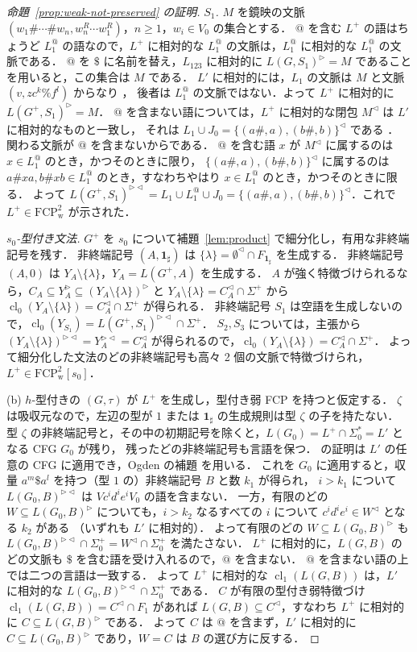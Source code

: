 \documentclass[11pt,a4paper]{ltjsarticle}
\numberwithin{equation}{section}
\theoremstyle{plain}
\theoremstyle{definition}
\theoremstyle{remark}
\theoremstyle{plain}
\newcommand{\eps}{\lambda}
\newcommand{\R}{^{\rhd}}
\newcommand{\Lc}{^{\lhd}}
\newcommand{\RL}{^{\rhd\lhd}}
\newcommand{\cl}{\operatorname{cl}}
\newcommand{\one}{\mathbf 1_\sharp}
\newcommand{\FCP}[2]{\mathrm{FCP}^{#1}_{\mathrm{#2}}}
\newcommand{\tFCP}[3]{\mathrm{FCP}^{#1}_{\mathrm{#2}}[#3]}
\begin{document}
\begin{proof}[命題~\ref{prop:weak-not-preserved} の証明]
\emph{$S_1$.}  $M$ を鏡映の文脈 $(w_1\#\cdots\#w_n,w_n^R\cdots w_1^R)$，$n\ge1$，$w_i\in V_0$ の集合とする．
$@$ を含む $L^+$ の語はちょうど $L_1^@$ の語なので，$L^+$ に相対的な $L_1^@$ の文脈は，$L_1^@$ に相対的な $L_1^@$ の文脈である．
$@$ を $\$$ に名前を替え，$L_{123}$ に相対的に $L(G,S_1)\R=M$ であること \citep[proof of Lemma~8]{ky2017} を用いると，この集合は $M$ である．
$L'$ に相対的には，$L_1$ の文脈は $M$ と文脈 $(v,zc^k\%f^l)$ からなり \citep[proof of Lemma~12]{ky2017}，
後者は $L_1^@$ の文脈ではない．よって $L^+$ に相対的に $L(G^+,S_1)\R=M$．
$@$ を含まない語については，$L^+$ に相対的な閉包 $M\Lc$ は $L'$ に相対的なものと一致し，
それは $L_1\cup J_0=\{(a\#,a),(b\#,b)\}\Lc$ である \citep[proof of Lemma~12]{ky2017}．
関わる文脈が $@$ を含まないからである．
$@$ を含む語 $x$ が $M\Lc$ に属するのは $x\in L_1^@$ のとき，かつそのときに限り，
$\{(a\#,a),(b\#,b)\}\Lc$ に属するのは $a\#xa,b\#xb\in L_1^@$ のとき，すなわちやはり $x\in L_1^@$ のとき，かつそのときに限る．
よって $L(G^+,S_1)\RL=L_1\cup L_1^@\cup J_0=\{(a\#,a),(b\#,b)\}\Lc$．これで $L^+\in\FCP2{w}$ が示された．

\emph{$s_0$-型付き文法.}  $G^+$ を $s_0$ について補題~\ref{lem:product} で細分化し，有用な非終端記号を残す．
非終端記号 $(A,\one)$ は $\{\eps\}=\emptyset\Lc\cap F_{\one}$ を生成する．
非終端記号 $(A,0)$ は $Y_A\setminus\{\eps\}$，$Y_A=L(G^+,A)$ を生成する．
$A$ が強く特徴づけられるなら，$C_A\subseteq Y_A\R\subseteq(Y_A\setminus\{\eps\})\R$ と $Y_A\setminus\{\eps\}=C_A\Lc\cap\Sigma^+$ から
$\cl_0(Y_A\setminus\{\eps\})=C_A\Lc\cap\Sigma^+$ が得られる．
非終端記号 $S_1$ は空語を生成しないので，$\cl_0(Y_{S_1})=L(G^+,S_1)\RL\cap\Sigma^+$．
$S_2,S_3$ については，主張から $(Y_A\setminus\{\eps\})\RL=Y_A\RL=C_A\Lc$ が得られるので，$\cl_0(Y_A\setminus\{\eps\})=C_A\Lc\cap\Sigma^+$．
よって細分化した文法のどの非終端記号も高々 2 個の文脈で特徴づけられ，$L^+\in\tFCP2{w}{s_0}$．

(b) $h$-型付きの $(G,\tau)$ が $L^+$ を生成し，型付き弱 FCP を持つと仮定する．
$\zeta$ は吸収元なので，左辺の型が $1$ または $\one$ の生成規則は型 $\zeta$ の子を持たない．
型 $\zeta$ の非終端記号と，その中の初期記号を除くと，$L(G_0)=L^+\cap\Sigma_0^*=L'$ となる CFG $G_0$ が残り，
残ったどの非終端記号も言語を保つ．
\citet[Lemma~13]{ky2017} の証明は $L'$ の任意の CFG に適用でき，Ogden の補題 \citep{ogden1968} を用いる．
これを $G_0$ に適用すると，収量 $a^{m}\$a^{l}$ を持つ（型 $1$ の）非終端記号 $B$ と数 $k_1$ が得られ，
$i>k_1$ について $L(G_0,B)\RL$ は $Vc^id^ie^iV_0$ の語を含まない．
一方，有限のどの $W\subseteq L(G_0,B)\R$ についても，$i>k_2$ なるすべての $i$ について $c^id^ie^i\in W\Lc$ となる $k_2$ がある
（いずれも $L'$ に相対的）．
よって有限のどの $W\subseteq L(G_0,B)\R$ も $L(G_0,B)\RL\cap\Sigma_0^+=W\Lc\cap\Sigma_0^+$ を満たさない．
$L^+$ に相対的に，$L(G,B)$ のどの文脈も $\$$ を含む語を受け入れるので，$@$ を含まない．
$@$ を含まない語の上では二つの言語は一致する．
よって $L^+$ に相対的な $\cl_1(L(G,B))$ は，$L'$ に相対的な $L(G_0,B)\RL\cap\Sigma_0^+$ である．
$C$ が有限の型付き弱特徴づけ $\cl_1(L(G,B))=C\Lc\cap F_1$ があれば $L(G,B)\subseteq C\Lc$，すなわち $L^+$ に相対的に $C\subseteq L(G,B)\R$ である．
よって $C$ は $@$ を含まず，$L'$ に相対的に $C\subseteq L(G_0,B)\R$ であり，$W=C$ は $B$ の選び方に反する．


\end{proof}
\end{document}
